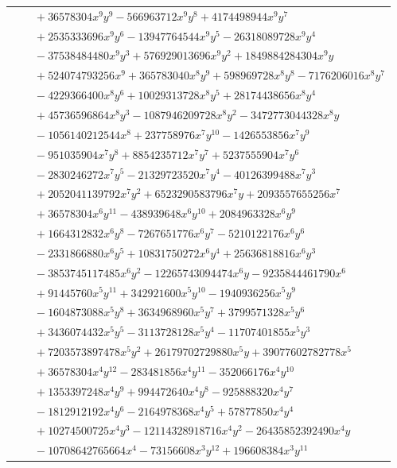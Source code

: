 \documentclass[11pt]{article}
\begin{document}
\begin{longtable}{@{}ll@{}}
 & $\quad +36578304x^{9}y^{9}-566963712x^{9}y^{8}+4174498944x^{9}y^{7}$\\
 & $\quad +2535333696x^{9}y^{6}-13947764544x^{9}y^{5}-26318089728x^{9}y^{4}$\\
 & $\quad -37538484480x^{9}y^{3}+576929013696x^{9}y^{2}+1849884284304x^{9}y$\\
 & $\quad +524074793256x^{9}+365783040x^{8}y^{9}+598969728x^{8}y^{8}-7176206016x^{8}y^{7}$\\
 & $\quad -4229366400x^{8}y^{6}+10029313728x^{8}y^{5}+28174438656x^{8}y^{4}$\\
 & $\quad +45736596864x^{8}y^{3}-1087946209728x^{8}y^{2}-3472773044328x^{8}y$\\
 & $\quad -1056140212544x^{8}+237758976x^{7}y^{10}-1426553856x^{7}y^{9}$\\
 & $\quad -951035904x^{7}y^{8}+8854235712x^{7}y^{7}+5237555904x^{7}y^{6}$\\
 & $\quad -2830246272x^{7}y^{5}-21329723520x^{7}y^{4}-40126399488x^{7}y^{3}$\\
 & $\quad +2052041139792x^{7}y^{2}+6523290583796x^{7}y+2093557655256x^{7}$\\
 & $\quad +36578304x^{6}y^{11}-438939648x^{6}y^{10}+2084963328x^{6}y^{9}$\\
 & $\quad +1664312832x^{6}y^{8}-7267651776x^{6}y^{7}-5210122176x^{6}y^{6}$\\
 & $\quad -2331866880x^{6}y^{5}+10831750272x^{6}y^{4}+25636818816x^{6}y^{3}$\\
 & $\quad -3853745117485x^{6}y^{2}-12265743094474x^{6}y-9235844461790x^{6}$\\
 & $\quad +91445760x^{5}y^{11}+342921600x^{5}y^{10}-1940936256x^{5}y^{9}$\\
 & $\quad -1604873088x^{5}y^{8}+3634968960x^{5}y^{7}+3799571328x^{5}y^{6}$\\
 & $\quad +3436074432x^{5}y^{5}-3113728128x^{5}y^{4}-11707401855x^{5}y^{3}$\\
 & $\quad +7203573897478x^{5}y^{2}+26179702729880x^{5}y+39077602782778x^{5}$\\
 & $\quad +36578304x^{4}y^{12}-283481856x^{4}y^{11}-352066176x^{4}y^{10}$\\
 & $\quad +1353397248x^{4}y^{9}+994472640x^{4}y^{8}-925888320x^{4}y^{7}$\\
 & $\quad -1812912192x^{4}y^{6}-2164978368x^{4}y^{5}+57877850x^{4}y^{4}$\\
 & $\quad +10274500725x^{4}y^{3}-12114328918716x^{4}y^{2}-26435852392490x^{4}y$\\
 & $\quad -10708642765664x^{4}-73156608x^{3}y^{12}+196608384x^{3}y^{11}$\\

\end{longtable}
\end{document}
